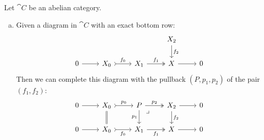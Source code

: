 \begin{theorem}
    \label{thm:abelian-cat-completing-diagram}
    Let \(\cat C\) be an abelian category.
    \begin{enumerate}[(a)]\setlength\itemsep{0em}
        \item Given a diagram in \(\cat C\) with an exact bottom row:
              \[
                  \begin{tikzcd}
                      & & &X_2 \ar[d, "f_2"] & \\
                      0 \ar[r]
                      &X_0 \ar[r, tail, "f_0"]
                      &X_1 \ar[r, two heads, "f_1"]
                      &X \ar[r]
                      &0
                  \end{tikzcd}
              \]
              Then we can complete this diagram with the pullback \((P, p_1, p_2)\) of the
              pair \((f_1, f_2)\):
              \[
                  \begin{tikzcd}
                      0 \ar[r]
                      &X_0
                      \ar[d, equals]
                      \ar[r, "p_0", tail]
                      &P
                      \ar[rd, "\lrcorner", phantom, very near start]
                      \ar[r, "p_2", two heads]
                      \ar[d, "p_1"']
                      &X_2
                      \ar[d, "f_2"]
                      \ar[r]
                      &0 \\
                      0 \ar[r]
                      &X_0 \ar[r, tail, "f_0"']
                      &X_1 \ar[r, two heads, "f_1"']
                      &X \ar[r]
                      &0
                  \end{tikzcd}
              \]


\end{enumerate}
\end{theorem}
